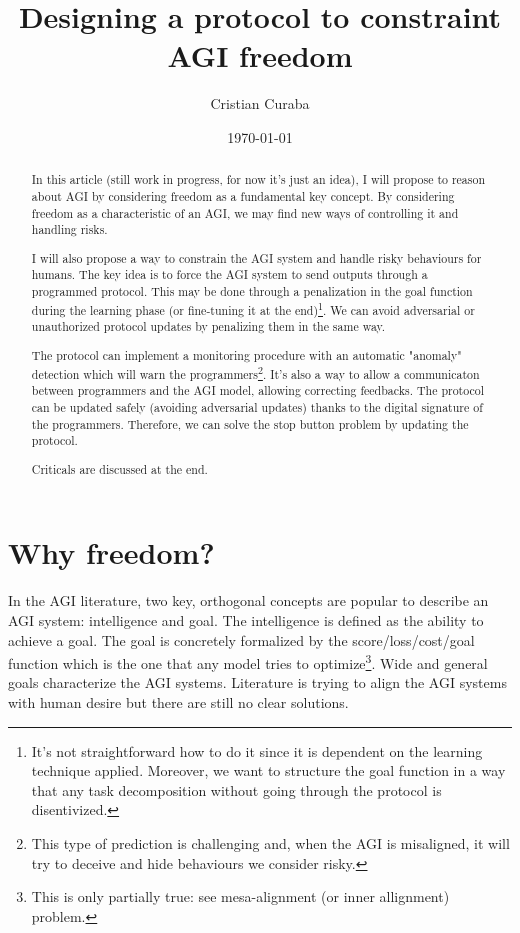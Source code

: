 \documentclass{article}
\begin{document}
\title{Designing a protocol to constraint AGI freedom}
\author{Cristian Curaba}
\date{\today}

\maketitle

\begin{abstract}
    In this article (still work in progress, for now it's just an idea), I will propose to reason about AGI by considering freedom as a fundamental key concept. 
    By considering freedom as a characteristic of an AGI, we may find new ways of controlling it and handling risks.
    
    I will also propose a way to constrain the AGI system and handle risky behaviours for humans. The key idea is to force the AGI system to send outputs through a programmed protocol. 
    This may be done through a penalization in the goal function during the learning phase (or fine-tuning it at the end)\footnote{It's not straightforward how to do it since it is dependent on the learning technique applied. 
    Moreover, we want to structure the goal function in a way that any task decomposition without going through the protocol is disentivized.}. 
    We can avoid adversarial or unauthorized protocol updates by penalizing them in the same way.
    
    The protocol can implement a monitoring procedure with an automatic "anomaly" detection which will warn the 
    programmers\footnote{This type of prediction is challenging and, when the AGI is misaligned, it will try to deceive and hide behaviours we consider risky.}. 
    It's also a way to allow a communicaton between programmers and the AGI model, allowing correcting feedbacks.
    The protocol can be updated safely (avoiding adversarial updates) thanks to the digital signature of the programmers. 
    Therefore, we can solve the stop button problem by updating the protocol. 
    
    Criticals are discussed at the end.
\end{abstract}

\section{Why freedom?}
In the AGI literature,  two key, orthogonal concepts are popular to describe an AGI system: intelligence and goal.
The intelligence is defined as the ability to achieve a goal.
The goal is concretely formalized by the score/loss/cost/goal function which is the one that any model tries to optimize\footnote{This is only partially true: see mesa-alignment (or inner allignment) problem.}.
Wide and general goals characterize the AGI systems.
Literature is trying to align the AGI systems with human desire but there are still no clear solutions.
\end{document}
